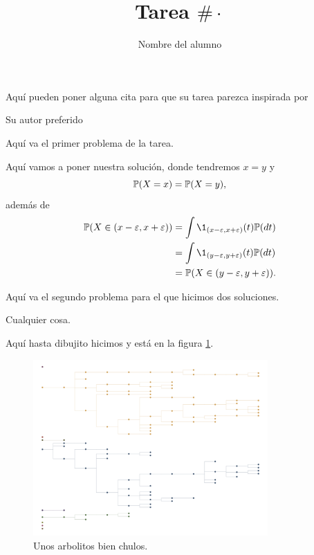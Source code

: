 \documentclass[
letterpaper,
12pt,
oneside,
onecolumn, %
article
]{memoir}
\title{Tarea $\# \cdot$} %
\author{Nombre del alumno} %
\begin{document}
\thispagestyle{empty}
\maketitle

\epigraph{Aquí pueden poner alguna cita para que su tarea parezca inspirada por}{Su autor preferido}

\Problema Aquí va el primer problema de la tarea.

\LaSolucion Aquí vamos a poner nuestra solución, donde tendremos $x = y$ y 
\[
\mathbb{P}(X = x) = \mathbb{P}(X = y),
\]
además de
\begin{align*}
    \PP(X \in (x -\varepsilon, x + \varepsilon)) & = \int \1_{(x -\varepsilon, x + \varepsilon)}(t)  \PP(dt) \\
    & = \int \1_{(y -\varepsilon, y + \varepsilon)}(t)  \PP(dt) \\
    & = \PP(X \in (y -\varepsilon, y + \varepsilon)).
\end{align*}

\Problema Aquí va el segundo problema para el que hicimos dos soluciones.

\UnaSolucion Cualquier cosa.

\UnaSolucion Aquí hasta dibujito hicimos y está en la figura \ref{galton watson}.

\begin{figure}[ht]
    \centering
    \includegraphics[width=0.8\textwidth,keepaspectratio]{galton_watson.png}
    \caption{Unos arbolitos bien chulos.}
    \label{galton watson}
\end{figure}

\end{document}
